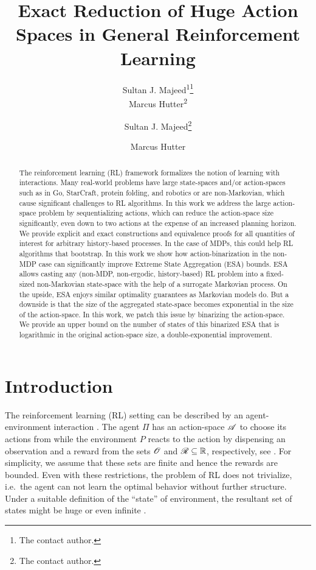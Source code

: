 \documentclass{article} %
\author{
        Sultan J. Majeed\textsuperscript{\rm 1}\thanks{The contact author.}\\
        Marcus Hutter\textsuperscript{\rm 2}\\
    }
\author{
            Sultan J. Majeed\thanks{The contact author.}
            \contact{sultan.pk} \affiliation{Research School of Computer Science, ANU}
            \and
            Marcus Hutter%
            \contact{hutter1.net} \affiliation{Google DeepMind \& Research School of Computer Science, ANU}
        }
\title{
    Exact Reduction of Huge Action Spaces in General Reinforcement Learning%
}
\begin{document}


\maketitle


\begin{abstract}
    The reinforcement learning (RL) framework formalizes the notion of learning with interactions.
    Many real-world problems have large state-spaces and/or action-spaces such as in Go, StarCraft, protein folding, and robotics or are non-Markovian, which cause significant challenges to RL algorithms.
    In this work we address the large action-space problem by sequentializing actions, which can reduce the action-space size significantly, even down to two actions at the expense of an increased planning horizon. We provide explicit and exact constructions and equivalence proofs for all quantities of interest for arbitrary history-based processes. In the case of MDPs, this could help RL algorithms that bootstrap.
    In this work we show how action-binarization in the non-MDP case can significantly improve Extreme State Aggregation (ESA) bounds. ESA allows casting any (non-MDP, non-ergodic, history-based) RL problem into a fixed-sized non-Markovian state-space with the help of a surrogate Markovian process. On the upside, ESA enjoys similar optimality guarantees as Markovian models do. But a downside is that the size of the aggregated state-space becomes exponential in the size of the action-space. In this work, we patch this issue by binarizing the action-space. We provide an upper bound on the number of states of this binarized ESA that is logarithmic in the original action-space size, a double-exponential improvement.
\end{abstract}



\section{Introduction}

The reinforcement learning (RL) setting can be described by an agent-environment interaction \cite{Sutton2018}. The agent $\Pi$ has an action-space $\mathscr{A}$ to choose its actions from while the environment $P$ reacts to the action by dispensing an observation and a reward from the sets $\mathscr{O}$ and $\mathscr{R} \subseteq \mathbb{R}$, respectively, see . For simplicity, we assume that these sets are finite and hence the rewards are bounded. Even with these restrictions, the problem of RL does not trivialize, i.e.\ the agent can not learn the optimal behavior without further structure. Under a suitable definition of the ``state'' of environment, the resultant set of states might be huge or even infinite \cite{Powell2011}.
\end{document}
